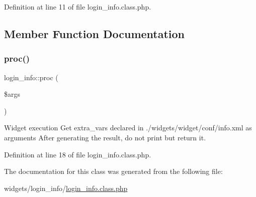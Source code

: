 Definition at line 11 of file login\+\_\+info.\+class.\+php.



\subsection{Member Function Documentation}
\mbox{\label{classlogin__info_aae51e17272d714226674208d3bdbf18c}} 
\subsubsection{\texorpdfstring{proc()}{proc()}}
{\footnotesize\ttfamily login\+\_\+info\+::proc (\begin{DoxyParamCaption}\item[{}]{\$args }\end{DoxyParamCaption})}



Widget execution Get extra\+\_\+vars declared in ./widgets/widget/conf/info.xml as arguments After generating the result, do not print but return it. 



Definition at line 18 of file login\+\_\+info.\+class.\+php.



The documentation for this class was generated from the following file\+:\begin{DoxyCompactItemize}
\item 
widgets/login\+\_\+info/\hyperlink{login__info_8class_8php}{login\+\_\+info.\+class.\+php}\end{DoxyCompactItemize}
